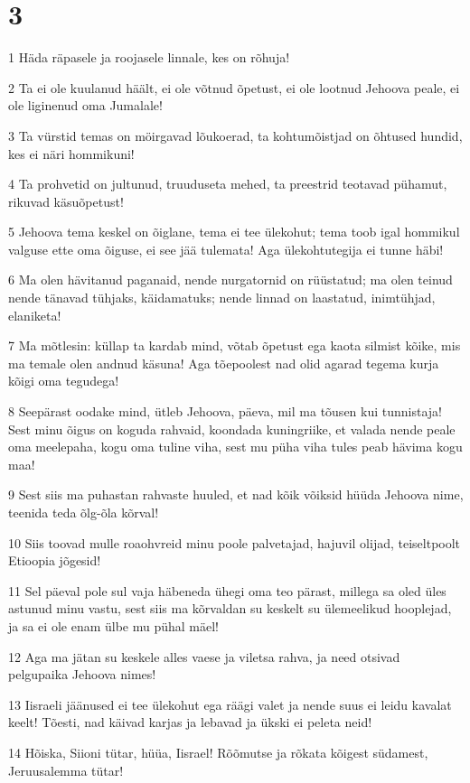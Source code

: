 \chapter{3}

\par 1 Häda räpasele ja roojasele linnale, kes on rõhuja!
\par 2 Ta ei ole kuulanud häält, ei ole võtnud õpetust, ei ole lootnud Jehoova peale, ei ole liginenud oma Jumalale!
\par 3 Ta vürstid temas on möirgavad lõukoerad, ta kohtumõistjad on õhtused hundid, kes ei näri hommikuni!
\par 4 Ta prohvetid on jultunud, truuduseta mehed, ta preestrid teotavad pühamut, rikuvad käsuõpetust!
\par 5 Jehoova tema keskel on õiglane, tema ei tee ülekohut; tema toob igal hommikul valguse ette oma õiguse, ei see jää tulemata! Aga ülekohtutegija ei tunne häbi!
\par 6 Ma olen hävitanud paganaid, nende nurgatornid on rüüstatud; ma olen teinud nende tänavad tühjaks, käidamatuks; nende linnad on laastatud, inimtühjad, elaniketa!
\par 7 Ma mõtlesin: küllap ta kardab mind, võtab õpetust ega kaota silmist kõike, mis ma temale olen andnud käsuna! Aga tõepoolest nad olid agarad tegema kurja kõigi oma tegudega!
\par 8 Seepärast oodake mind, ütleb Jehoova, päeva, mil ma tõusen kui tunnistaja! Sest minu õigus on koguda rahvaid, koondada kuningriike, et valada nende peale oma meelepaha, kogu oma tuline viha, sest mu püha viha tules peab hävima kogu maa!
\par 9 Sest siis ma puhastan rahvaste huuled, et nad kõik võiksid hüüda Jehoova nime, teenida teda õlg-õla kõrval!
\par 10 Siis toovad mulle roaohvreid minu poole palvetajad, hajuvil olijad, teiseltpoolt Etioopia jõgesid!
\par 11 Sel päeval pole sul vaja häbeneda ühegi oma teo pärast, millega sa oled üles astunud minu vastu, sest siis ma kõrvaldan su keskelt su ülemeelikud hooplejad, ja sa ei ole enam ülbe mu pühal mäel!
\par 12 Aga ma jätan su keskele alles vaese ja viletsa rahva, ja need otsivad pelgupaika Jehoova nimes!
\par 13 Iisraeli jäänused ei tee ülekohut ega räägi valet ja nende suus ei leidu kavalat keelt! Tõesti, nad käivad karjas ja lebavad ja ükski ei peleta neid!
\par 14 Hõiska, Siioni tütar, hüüa, Iisrael! Rõõmutse ja rõkata kõigest südamest, Jeruusalemma tütar!
